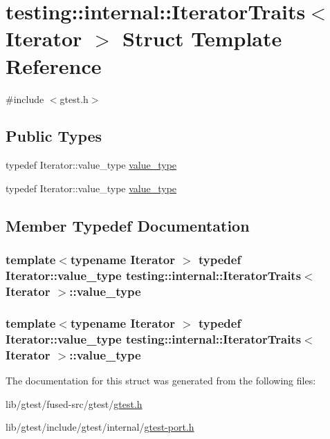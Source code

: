 \hypertarget{structtesting_1_1internal_1_1_iterator_traits}{\section{testing\-:\-:internal\-:\-:Iterator\-Traits$<$ Iterator $>$ Struct Template Reference}
\label{structtesting_1_1internal_1_1_iterator_traits}
}


{\ttfamily \#include $<$gtest.\-h$>$}

\subsection*{Public Types}
\begin{DoxyCompactItemize}
\item 
typedef Iterator\-::value\-\_\-type \hyperlink{structtesting_1_1internal_1_1_iterator_traits_a29de4320a9c53ce438d3561b94e515bb}{value\-\_\-type}
\item 
typedef Iterator\-::value\-\_\-type \hyperlink{structtesting_1_1internal_1_1_iterator_traits_a29de4320a9c53ce438d3561b94e515bb}{value\-\_\-type}
\end{DoxyCompactItemize}


\subsection{Member Typedef Documentation}
\hypertarget{structtesting_1_1internal_1_1_iterator_traits_a29de4320a9c53ce438d3561b94e515bb}{
\subsubsection[{value\-\_\-type}]{\setlength{\rightskip}{0pt plus 5cm}template$<$typename Iterator $>$ typedef Iterator\-::value\-\_\-type {\bf testing\-::internal\-::\-Iterator\-Traits}$<$ Iterator $>$\-::{\bf value\-\_\-type}}}\label{structtesting_1_1internal_1_1_iterator_traits_a29de4320a9c53ce438d3561b94e515bb}
\hypertarget{structtesting_1_1internal_1_1_iterator_traits_a29de4320a9c53ce438d3561b94e515bb}{
\subsubsection[{value\-\_\-type}]{\setlength{\rightskip}{0pt plus 5cm}template$<$typename Iterator $>$ typedef Iterator\-::value\-\_\-type {\bf testing\-::internal\-::\-Iterator\-Traits}$<$ Iterator $>$\-::{\bf value\-\_\-type}}}\label{structtesting_1_1internal_1_1_iterator_traits_a29de4320a9c53ce438d3561b94e515bb}


The documentation for this struct was generated from the following files\-:\begin{DoxyCompactItemize}
\item 
lib/gtest/fused-\/src/gtest/\hyperlink{fused-src_2gtest_2gtest_8h}{gtest.\-h}\item 
lib/gtest/include/gtest/internal/\hyperlink{gtest-port_8h}{gtest-\/port.\-h}\end{DoxyCompactItemize}
